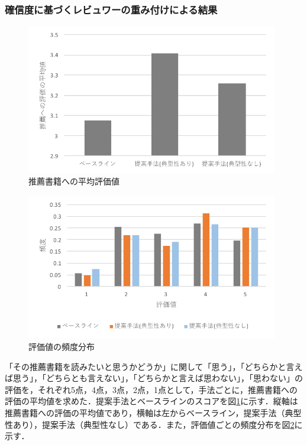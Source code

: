 \documentclass[a4paper,11pt,oneside,openany]{jsbook}
\begin{document}
		\subsubsection{確信度に基づくレビュワーの重み付けによる結果}
\begin{figure}[tb]
	\begin{center} %
		\includegraphics [width = 110mm] {figures/result2.pdf} %
	\end{center}
	\caption{推薦書籍への平均評価値} %
	\label{fig:result1} %
\end{figure}

\begin{figure}[tb]
	\begin{center} %
		\includegraphics [width = 110mm] {figures/result.pdf} %
	\end{center}
	\caption{評価値の頻度分布} %
	\label{fig:result2} %
\end{figure}

「その推薦書籍を読みたいと思うかどうか」に関して「思う」，「どちらかと言えば思う」，「どちらとも言えない」，「どちらかと言えば思わない」，「思わない」の評価を，それぞれ5点，4点，3点，2点，1点として，手法ごとに，推薦書籍への評価の平均値を求めた．提案手法とベースラインのスコアを図\ref{fig:result1}に示す．縦軸は推薦書籍への評価の平均値であり，横軸は左からベースライン，提案手法（典型性あり），提案手法（典型性なし）である．また，評価値ごとの頻度分布を図\ref{fig:result2}に示す．
\end{document}
